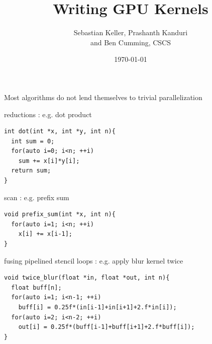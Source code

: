 \documentclass[aspectratio=43]{beamer}
\author{Sebastian Keller, Prashanth Kanduri\\ and Ben Cumming, CSCS}
\title{Writing GPU Kernels}
\subtitle{}
\date{\today}
\begin{document}
\cscstitle


\begin{frame}[fragile]{}
    \centering
    Most algorithms do not lend themselves to trivial parallelization

    \begin{code}{reductions : e.g. dot product}
        \begin{lstlisting}[style=boxcudatiny]
int dot(int *x, int *y, int n){
  int sum = 0;
  for(auto i=0; i<n; ++i)
    sum += x[i]*y[i];
  return sum;
}
        \end{lstlisting}
    \end{code}
\vspace{-7pt}
        \begin{code}{scan : e.g. prefix sum}
            \begin{lstlisting}[style=boxcudatiny]
void prefix_sum(int *x, int n){
  for(auto i=1; i<n; ++i)
    x[i] += x[i-1];
}
        \end{lstlisting}
    \end{code}
\vspace{-7pt}
    \begin{code}{fusing pipelined stencil loops : e.g. apply blur kernel twice}
        \begin{lstlisting}[style=boxcudatiny]
void twice_blur(float *in, float *out, int n){
  float buff[n];
  for(auto i=1; i<n-1; ++i)
    buff[i] = 0.25f*(in[i-1]+in[i+1]+2.f*in[i]);
  for(auto i=2; i<n-2; ++i)
    out[i] = 0.25f*(buff[i-1]+buff[i+1]+2.f*buff[i]);
}
        \end{lstlisting}
    \end{code}

\end{frame}
\end{document}
